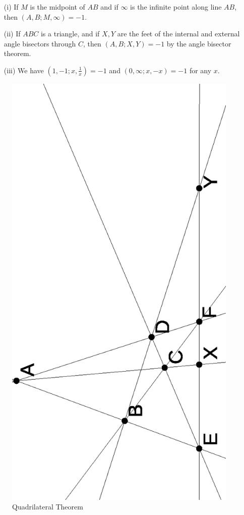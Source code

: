 \begin{ex}
\begin{itemize}
\item[(i)] If $M$ is the midpoint of $AB$ and if $\infty$ is the infinite point along line $AB$, then $(A,B;M,\infty) = -1$.

\item[(ii)] If $ABC$ is a triangle, and if $X,Y$ are the feet of the internal and external angle bisectors through $C$, then $(A,B;X,Y) = -1$ by the angle bisector theorem.

\item[(iii)] We have $(1,-1;x,\frac{1}{x}) = -1$ and $(0,\infty;x,-x) = -1$ for any $x$.
\end{itemize}
\end{ex}

\begin{figure}[!htb]
\centering
\includegraphics[scale=0.7,angle=270]{quad.eps}
\caption{Quadrilateral Theorem}
\end{figure}

